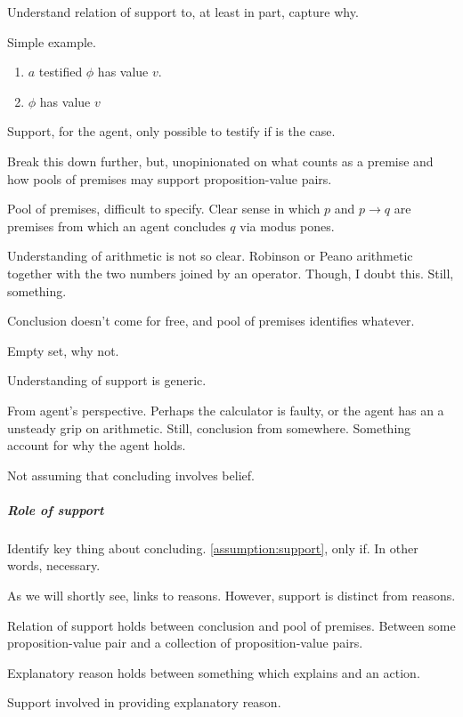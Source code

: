 \begin{note}
  Understand relation of support to, at least in part, capture why.

  Simple example.

  \begin{enumerate}
  \item
    \(a\) testified \(\phi\) has value \(v\).
  \item
    \(\phi\) has value \(v\)
  \end{enumerate}

  Support, for the agent, only possible to testify if is the case.

  Break this down further, but, unopinionated on what counts as a premise and how pools of premises may support proposition-value pairs.
\end{note}


\begin{note}
  Pool of premises, difficult to specify.
  Clear sense in which \(p\) and \(p \rightarrow q\) are premises from which an agent concludes \(q\) via modus pones.

  Understanding of arithmetic is not so clear.
  Robinson or Peano arithmetic together with the two numbers joined by an operator.
  Though, I doubt this.
  Still, something.

  Conclusion doesn't come for free, and pool of premises identifies whatever.

  Empty set, why not.
\end{note}

\begin{note}
  Understanding of support is generic.

  From agent's perspective.
  Perhaps the calculator is faulty, or the agent has an a unsteady grip on arithmetic.
  Still, conclusion from somewhere.
  Something account for why the agent holds.
\end{note}

\begin{note}
  {
    \color{red}
    Not assuming that concluding involves belief.
  }
\end{note}

\subparagraph{Role of support}

\begin{note}
  Identify key thing about concluding.
  \autoref{assumption:support}, only if.
  In other words, necessary.
\end{note}


\begin{note}
  As we will shortly see, links to reasons.
  However, support is distinct from reasons.

  Relation of support holds between conclusion and pool of premises.
  Between some proposition-value pair and a collection of proposition-value pairs.

  Explanatory reason holds between something which explains and an action.

  Support involved in providing explanatory reason.
\end{note}

